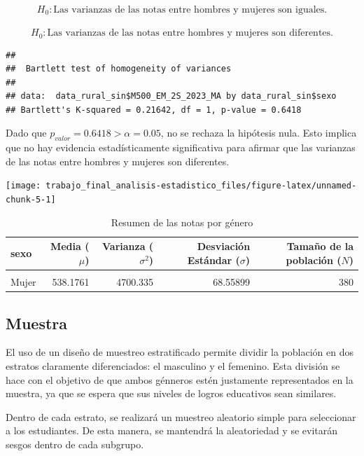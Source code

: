 \documentclass[
]{article}
\begin{document}
\[H_{0}: \text{Las varianzas de las notas entre hombres y mujeres son iguales.}\]\\
\[H_{0}: \text{Las varianzas de las notas entre hombres y mujeres son diferentes.}\]

\begin{verbatim}
## 
##  Bartlett test of homogeneity of variances
## 
## data:  data_rural_sin$M500_EM_2S_2023_MA by data_rural_sin$sexo
## Bartlett's K-squared = 0.21642, df = 1, p-value = 0.6418
\end{verbatim}

Dado que \(p_{valor}=0.6418>\alpha=0.05\), no se rechaza la hipótesis
nula. Esto implica que no hay evidencia estadísticamente significativa
para afirmar que las varianzas de las notas entre hombres y mujeres son
diferentes.

\begin{center}\texttt{[image: trabajo\_final\_analisis-estadistico\_files/figure-latex/unnamed-chunk-5-1]} \end{center}

\begin{table}[!h]
\centering
\caption{\label{tab:Estadisticas genero}Resumen de las notas por género}
\centering
\begin{tabular}[t]{lrrrr}
\toprule
sexo & Media (\(\mu\)) & Varianza (\(\sigma^{2}\)) & Desviación Estándar (\(\sigma\)) & Tamaño de la población (\(N\))\\
\midrule
\cellcolor{gray!10}{Hombre} & \cellcolor{gray!10}{549.3282} & \cellcolor{gray!10}{4936.985} & \cellcolor{gray!10}{70.26368} & \cellcolor{gray!10}{342}\\
Mujer & 538.1761 & 4700.335 & 68.55899 & 380\\
\bottomrule
\end{tabular}
\end{table}

\subsection*{Muestra}\label{muestra}

El uso de un diseño de muestreo estratificado permite dividir la
población en dos estratos claramente diferenciados: el masculino y el
femenino. Esta división se hace con el objetivo de que ambos génneros
estén justamente representados en la muestra, ya que se espera que sus
niveles de logros educativos sean similares.

Dentro de cada estrato, se realizará un muestreo aleatorio simple para
seleccionar a los estudiantes. De esta manera, se mantendrá la
aleatoriedad y se evitarán sesgos dentro de cada subgrupo.
\end{document}
